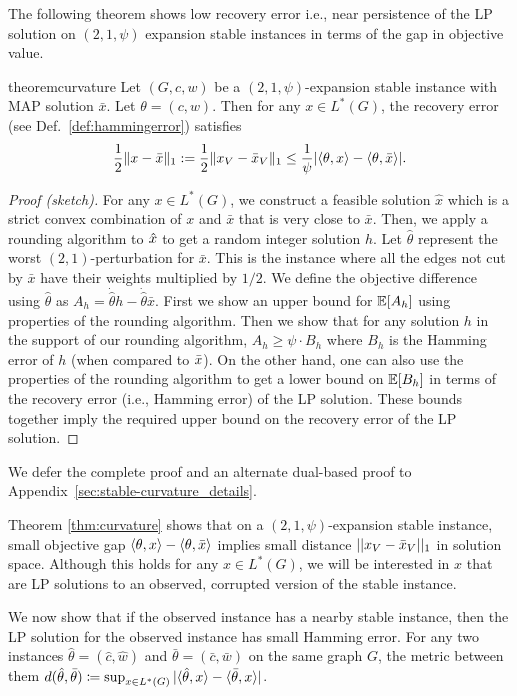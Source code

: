 The following theorem shows low recovery error i.e., near persistence of the LP solution on $(2,1,\psi)$ expansion stable instances in terms of the gap in objective value.  
\begin{restatable}{theorem}{curvature}\label{thm:curvature}
Let $(G,c,w)$ be a $(2,1,\psi)$-expansion stable instance with MAP solution $\bar{x}$. 
Let $\theta = (c,w)$. Then for any $x \in L^*(G)$, the recovery error (see Def.~\ref{def:hammingerror}) satisfies
\begin{equation}\label{eq:deviationLP}
    \frac{1}{2}\lVert x - \bar{x} \rVert_1:=\frac{1}{2}\lVert x_V - \bar{x}_V \rVert_1 \le \frac{1}{\psi}|\langle \theta,x\rangle-\langle \theta,\bar{x}\rangle|.
\end{equation}
\end{restatable}
\begin{proof}[Proof (sketch)]
For any $x \in L^*(G)$, we construct a feasible solution $\hat{x}$ which is a strict convex combination of $x$ and $\bar{x}$ that is very close to $\bar{x}$. Then, we apply a rounding algorithm to $\hat{x}$ to get a random integer solution $h$. Let $\hat\theta$ represent the worst $(2,1)$-perturbation for $\bar{x}$. This is the instance where all the edges not cut by $\bar{x}$ have their weights multiplied by $1/2$. We define the objective difference using $\hat\theta$ as $A_h = \dot{\hat\theta}{h} - \dot{\hat\theta}{\bar{x}}$. First we show an upper bound for $\operatorname*{\mathbb{E}}[A_h]$ using properties of the rounding algorithm. Then we show that for any solution $h$ in the support of our rounding algorithm, $A_h \geq \psi \cdot B_h$ where $B_h$ is the Hamming error of $h$ (when compared to $\bar{x}$). 
On the other hand, one can also use the properties of the rounding algorithm to get a lower bound on $\operatorname*{\mathbb{E}}[B_h]$ in terms of the recovery error (i.e., Hamming error) of the LP solution. These bounds together imply the required upper bound on the recovery error of the LP solution. 
\end{proof}
We defer the complete proof and an alternate dual-based proof to Appendix~\ref{sec:stable-curvature_details}. 

Theorem \ref{thm:curvature} shows that on a $(2,1,\psi)$-expansion stable instance, small objective gap $\langle \theta,x\rangle - \langle \theta,\bar{x}\rangle$ implies small distance $||x_V-\bar{x}_V||_1$ in solution space. Although this holds for any $x \in L^*(G)$, we will be interested in $x$ that are LP solutions to an observed, corrupted version of the stable instance.

We now show that if the observed instance has a nearby stable instance, then the LP solution for the observed instance has small Hamming error. For any two instances $\hat{\theta} = (\hat{c},\hat{w})$ and $\bar{\theta} = (\bar{c}, \bar{w})$ on the same graph $G$, the metric between them $d(\hat{\theta},\bar{\theta}) \coloneqq \sup_{x \in L^*(G)} | \langle \hat{\theta},x\rangle  - \langle \bar{\theta},x\rangle|$.

